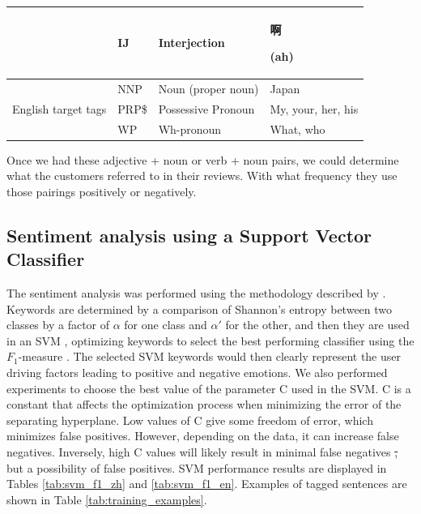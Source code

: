 \documentclass[smallextended,natbib]{svjour3}       %
\providecommand{\DIFdel}[1]{{\protect\color{red}\sout{#1}}}                      %
\providecommand{\DIFdelbegin}{} %
\providecommand{\DIFdelend}{} %
\newcommand{\DIFscaledelfig}{0.5}
\newlength{\DIFdelgraphicswidth} %
\newlength{\DIFdelgraphicsheight} %
\newcommand{\DIFdelincludegraphics}[2][]{%
\sbox{\DIFdelgraphicsbox}{\DIFOincludegraphics[#1]{#2}}%
\settoboxwidth{\DIFdelgraphicswidth}{\DIFdelgraphicsbox} %
\settoboxtotalheight{\DIFdelgraphicsheight}{\DIFdelgraphicsbox} %
\scalebox{\DIFscaledelfig}{%
\parbox[b]{\DIFdelgraphicswidth}{\usebox{\DIFdelgraphicsbox}\\[-\baselineskip] \rule{\DIFdelgraphicswidth}{0em}}\llap{\resizebox{\DIFdelgraphicswidth}{\DIFdelgraphicsheight}{%
\setlength{\unitlength}{\DIFdelgraphicswidth}%
\begin{picture}(1,1)%
\thicklines\linethickness{2pt} %
{\color[rgb]{1,0,0}\put(0,0){\framebox(1,1){}}}%
{\color[rgb]{1,0,0}\put(0,0){\line( 1,1){1}}}%
{\color[rgb]{1,0,0}\put(0,1){\line(1,-1){1}}}%
\end{picture}%
}\hspace*{3pt}}} %
} %
\DeclareRobustCommand{\DIFdelbegin}{\DIFOdelbegin \let\includegraphics\DIFdelincludegraphics} %
\DeclareRobustCommand{\DIFdelend}{\DIFOaddend \let\includegraphics\DIFOincludegraphics} %
\begin{document}
\begin{table}[ht]
{\begin{tabular}{|c|l|l|l|}
                                                & IJ    & Interjection       & \begin{CJK}{UTF8}{gbsn}啊\end{CJK} (ah)     \\ \hline
        \multirow{3}{*}{English target tags}    & NNP   & Noun (proper noun) & Japan                                      \\ \cline{2-4} 
                                                & PRP\$ & Possessive Pronoun & My, your, her, his                         \\ \cline{2-4} 
                                                & WP    & Wh-pronoun         & What, who                                  \\ \hline
        \end{tabular}%
        }
    \end{table}

    Once we had these adjective + noun or verb + noun pairs, we could determine what the customers referred to in their reviews. With what frequency they use those pairings positively or negatively.

  \subsection{Sentiment analysis using a Support Vector Classifier}\label{sentimentanalysis}

    The sentiment analysis was performed using the methodology described by \cite{Aleman2018ICAROB}. Keywords are determined by a comparison of Shannon's entropy \cite[][]{shannon1948} between two classes by a factor of \(\alpha\) for one class and \(\alpha'\) for the other, and then they are used in an SVM \cite[][]{cortes1995}, optimizing keywords to select the best performing classifier using the \(F_1\)-measure \cite[][]{powers2011}. The selected SVM keywords would then clearly represent the user driving factors leading to positive and negative emotions. We also performed experiments to choose the best value of the parameter C used in the SVM. C is a constant that affects the optimization process when minimizing the error of the separating hyperplane. Low values of C give some freedom of error, which minimizes false positives. However, depending on the data, it can increase false negatives. Inversely, high C values will likely result in minimal false negatives \DIFdelbegin \DIFdel{, }\DIFdelend but a possibility of false positives. SVM performance results are displayed in  Tables \ref{tab:svm_f1_zh} and \ref{tab:svm_f1_en}. Examples of tagged sentences are shown in Table \ref{tab:training_examples}. 
\end{document}
